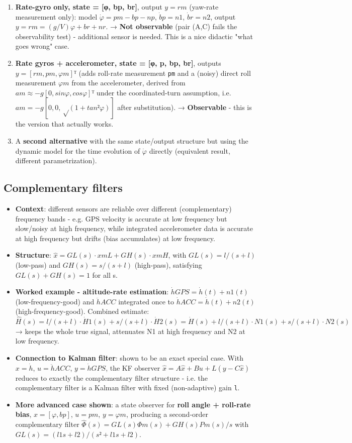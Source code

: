 \documentclass[11pt]{article}
\begin{document}
\begin{enumerate}
\item \textbf{Rate-gyro only, state = [φ, bp, br]}, output $y = rm$ (yaw-rate measurement only): model
$\dot{φ} = pm - bp - np$, $\dot{b}p = n1$, $\dot{b}r = n2$, output $y = rm = (g/V)φ + br + nr$.
→ \textbf{Not observable} (pair (A,C) fails the observability test) - additional sensor is needed. This is a nice didactic "what goes wrong" case.
\item \textbf{Rate gyros + accelerometer, state = [φ, p, bp, br]}, outputs $y = [rm, pm, φm]ᵀ$ (adds roll-rate measurement \texttt{pm} and a (noisy) direct roll measurement $φm$ from the accelerometer, derived from $am ≈ -g[0, sinφ, cosφ]ᵀ$ under the coordinated-turn assumption, i.e. $am = -g[0,0,√(1+tan²φ)]$ after substitution).
→ \textbf{Observable} - this is the version that actually works.
\item A \textbf{second alternative} with the same state/output structure but using the dynamic model for the time evolution of $\dot{φ}$ directly (equivalent result, different parametrization).
\end{enumerate}

\subsection{Complementary filters}
\begin{itemize}
\item \textbf{Context}: different sensors are reliable over different (complementary) frequency bands - e.g. GPS velocity is accurate at low frequency but slow/noisy at high frequency, while integrated accelerometer data is accurate at high frequency but drifts (bias accumulates) at low frequency.
\item \textbf{Structure}: $\hat{x} = GL(s)·xmL + GH(s)·xmH$, with $GL(s) = l/(s+l)$ (low-pass) and $GH(s) = s/(s+l)$ (high-pass), satisfying $GL(s) + GH(s) = 1$ for all s.
\item \textbf{Worked example - altitude-rate estimation}: $\dot{h}GPS = \dot{h}(t) + n1(t)$ (low-frequency-good) and $\ddot{h}ACC$ integrated once to $\dot{h}ACC = \dot{h}(t) + n2(t)$ (high-frequency-good). Combined estimate:
$\hat{H}(s) = l/(s+l)·\dot{H}1(s) + s/(s+l)·\dot{H}2(s) = \dot{H}(s) + l/(s+l)·N1(s) + s/(s+l)·N2(s)$
→ keeps the whole true signal, attenuates N1 at high frequency and N2 at low frequency.
\item \textbf{Connection to Kalman filter}: shown to be an exact special case. With $x = \dot{h}$, $u = \ddot{h}ACC$, $y = \dot{h}GPS$, the KF observer $\hat{x\dot{}} = A\hat{x}+Bu+L(y-C\hat{x})$ reduces to exactly the complementary filter structure - i.e. the complementary filter is a Kalman filter with fixed (non-adaptive) gain \texttt{l}.
\item \textbf{More advanced case shown}: a state observer for \textbf{roll angle + roll-rate bias}, $x=[φ,bp]$, $u=pm$, $y=φm$, producing a second-order complementary filter $\hat{Φ}(s) = GL(s)Φm(s) + GH(s)Pm(s)/s$ with $GL(s) = (l1s+l2)/(s²+l1s+l2)$.
\end{itemize}
\end{document}

